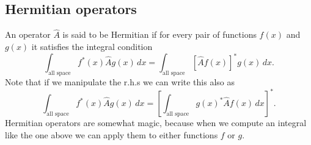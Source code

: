 \documentclass[../Main/chem331-notes.tex]{subfiles}
\begin{document}
\subsection{Hermitian operators}
An operator $\hat{A}$ is said to be Hermitian if for every pair of functions $f(x)$ and $g(x)$ it satisfies the integral condition
\begin{equation}
\int_\text{all space} f^*(x) \hat{A} g(x) \, dx = \int_\text{all space} [\hat{A} f(x)]^*  g(x) \, dx.
\end{equation}
Note that if we manipulate the r.h.s we can write this also as
\begin{equation}
\int_\text{all space} f^*(x) \hat{A} g(x) \, dx = \left[\int_\text{all space} g(x)^* \hat{A} f(x)   \, dx \right]^*.
\end{equation}
Hermitian operators are somewhat magic, because when we compute an integral like the one above we can apply them to either functions $f$ or $g$.
\end{document}
